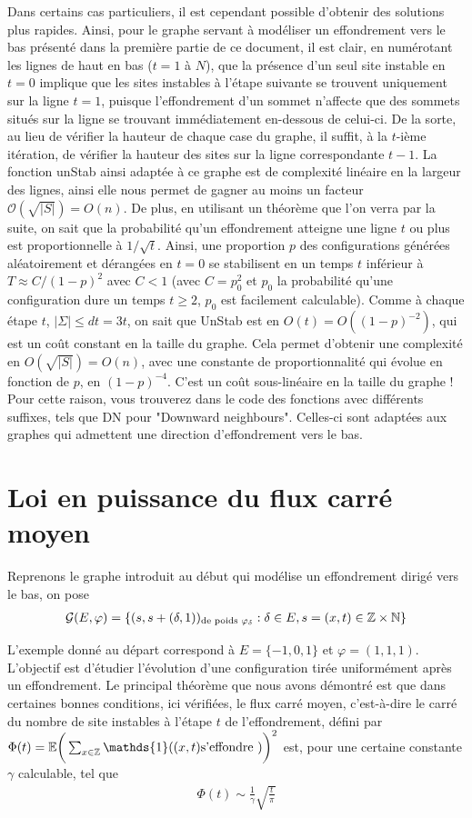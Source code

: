 \documentclass{article}
\begin{document}
Dans certains cas particuliers, il est cependant possible d’obtenir des solutions plus rapides. Ainsi, pour le graphe servant à modéliser un effondrement vers le bas présenté dans la première partie de ce document, il est clair, en numérotant les lignes de haut en bas ($t=1$ à $N$), que la présence d'un seul site instable en $t = 0$ implique que les sites instables à l'étape suivante se trouvent uniquement sur la ligne $t = 1$, puisque l'effondrement d’un sommet n'affecte que des sommets situés sur la ligne se trouvant immédiatement en-dessous de celui-ci. De la sorte, au lieu de vérifier la hauteur de chaque case du graphe, il suffit, à la $t$-ième itération, de vérifier la hauteur des sites sur la ligne correspondante $t-1$. La fonction unStab ainsi adaptée à ce graphe est de complexité linéaire en la largeur des lignes, ainsi elle nous permet de gagner au moins un facteur $\mathcal{O}(\sqrt{|S|}) = O(n)$. 
De plus, en utilisant un théorème que l'on verra par la suite, on sait que la probabilité qu'un effondrement atteigne une ligne $t$ ou plus est proportionnelle à $1/\sqrt{t}$. Ainsi, une proportion $p$ des configurations générées aléatoirement et dérangées en $t=0$ se stabilisent en un temps $t$ inférieur à $T\approx C/(1-p)^2$ avec $C< 1$ (avec $C = p_0^2$ et $p_0$ la probabilité qu'une configuration dure un temps $t\geq 2$, $p_0$ est facilement calculable). 
Comme à chaque étape $t$,  $|\Sigma|\leq dt =3t$, on sait que UnStab est en $O(t)=O((1-p)^{-2})$, qui est un coût constant en la taille du graphe. Cela permet d'obtenir une complexité en  $O(\sqrt{|S|})=O(n)$, avec une constante de proportionnalité qui évolue en fonction de $p$, en $(1-p)^{-4}$. C'est un coût sous-linéaire en la taille du graphe !
Pour cette raison, vous trouverez dans le code des fonctions avec différents suffixes, tels que DN pour "Downward neighbours". Celles-ci sont adaptées aux graphes qui admettent une direction d'effondrement vers le bas.
\section{Loi en puissance du flux carré moyen}
Reprenons le graphe introduit au début qui modélise un effondrement dirigé vers le bas, on pose
\begin{align*}
\mathcal{G}(E, \varphi) = \{(s,s+(\delta,1))_{\textup{de poids } \varphi_\delta} : \delta\in E, s=(x,t)\in\mathbb{Z}\times\mathbb{N}\}
\end{align*}

L'exemple donné au départ correspond à $E= \{-1,0,1\}$ et $\varphi = (1, 1, 1)$. L'objectif est d'étudier l'évolution d'une configuration tirée uniformément après un effondrement. Le principal théorème que nous avons démontré est que dans certaines bonnes conditions, ici vérifiées, le flux carré moyen, c'est-à-dire le carré du nombre de site instables à l'étape $t$ de l'effondrement, défini par $\Phi(t) = \mathbb{E}\bigg(\sum_{x\in\mathbb{Z}} \mathds{1}((x,t) \textup{s'effondre })\bigg)^2$ est, pour une certaine constante $\gamma$ calculable, tel que
	\begin{align*}
		\Phi(t) \sim \frac{1}{\gamma}\sqrt{\frac{t}{\pi}}
	\end{align*}
\end{document}
